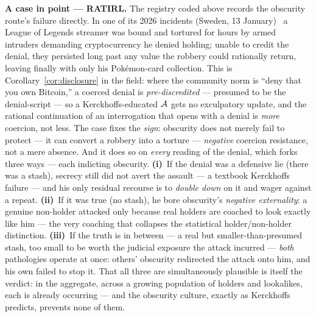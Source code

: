 \medskip\noindent\textbf{A case in point --- RATIRL.}\label{par:ratirl} The registry coded above records
the obscurity route's failure directly. In one of its 2026 incidents (Sweden, 13
January)~\cite{ratirl} a League of Legends streamer was bound and tortured for hours by
armed intruders demanding cryptocurrency he denied holding; unable to credit the
denial, they persisted long past any value the robbery could rationally return,
leaving finally with only his Pok\'emon-card collection. This is
Corollary~\ref{cor:disclosure} in the field: where the community norm is ``deny that
you own Bitcoin,'' a coerced denial is \emph{pre-discredited} --- presumed to be the
denial-script --- so a Kerckhoffs-educated $\mathcal{A}$ gets no exculpatory update, and
the rational continuation of an interrogation that opens with a denial is \emph{more}
coercion, not less. The case fixes the
\emph{sign}: obscurity does not merely fail to protect --- it can convert a robbery
into a torture --- \emph{negative} coercion resistance, not a mere absence. And it does so on \emph{every}
reading of the denial, which forks three ways --- each indicting obscurity.
\textbf{(i)}~If the denial was a defensive lie (there was a stash), secrecy still did
not avert the assault --- a textbook Kerckhoffs failure --- and his only residual
recourse is to \emph{double down} on it and wager against a repeat. \textbf{(ii)}~If it
was true (no stash), he bore obscurity's \emph{negative externality}: a genuine
non-holder attacked only because real holders are coached to look exactly like him ---
the very coaching that collapses the statistical holder/non-holder distinction.
\textbf{(iii)}~If the truth is in between --- a real but smaller-than-presumed stash,
too small to be worth the judicial exposure the attack incurred --- \emph{both}
pathologies operate at once: others' obscurity redirected the attack onto him, and his
own failed to stop it. That all three are simultaneously plausible is itself the
verdict: in the aggregate, across a growing population of holders and lookalikes, each
is already occurring --- and the obscurity culture, exactly as Kerckhoffs predicts,
prevents none of them.
